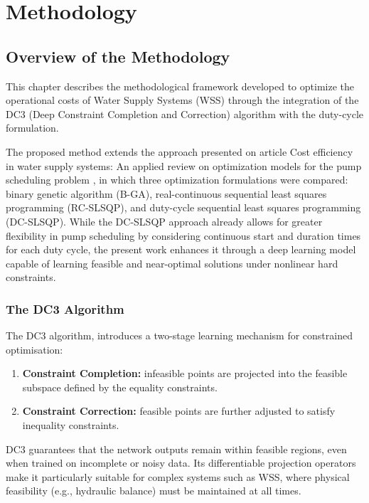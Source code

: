 \chapter{Methodology}
\label{chap:methodology}

\section{Overview of the Methodology}

This chapter describes the methodological framework developed to optimize the operational costs of Water Supply Systems (WSS) through the integration of the DC3 (Deep Constraint Completion and Correction) algorithm with the duty-cycle formulation. 

The proposed method extends the approach presented on article Cost efficiency in water supply systems: An applied review on optimization models for the pump scheduling problem \cite{rfc20}, in which three optimization formulations were compared: binary genetic algorithm (B-GA), real-continuous sequential least squares programming (RC-SLSQP), and duty-cycle sequential least squares programming (DC-SLSQP). While the DC-SLSQP approach already allows for greater flexibility in pump scheduling by considering continuous start and duration times for each duty cycle, the present work enhances it through a deep learning model capable of learning feasible and near-optimal solutions under nonlinear hard constraints.


\subsection{The DC3 Algorithm}

The DC3 algorithm\cite{rfc14}, introduces a two-stage learning mechanism for constrained optimisation:
\begin{enumerate}
    \item \textbf{Constraint Completion:} infeasible points are projected into the feasible subspace defined by the equality constraints.
    \item \textbf{Constraint Correction:} feasible points are further adjusted to satisfy inequality constraints.
\end{enumerate}

DC3 guarantees that the network outputs remain within feasible regions, even when trained on incomplete or noisy data. Its differentiable projection operators make it particularly suitable for complex systems such as WSS, where physical feasibility (e.g., hydraulic balance) must be maintained at all times.

